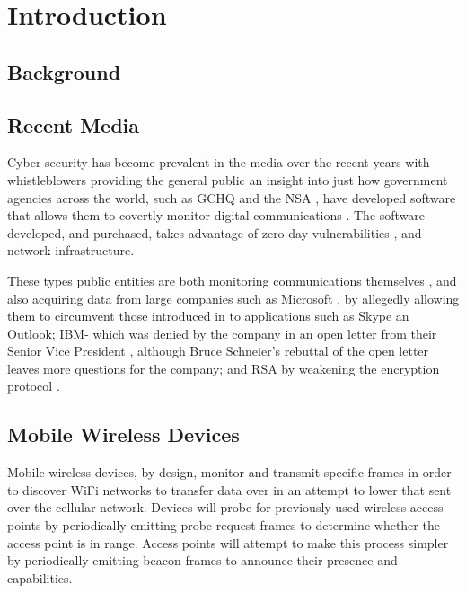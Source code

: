 \section {Introduction}
\subsection{Background}
\subsection{Recent Media}
Cyber security has become prevalent in the media over the recent years with whistleblowers \cite{intro:guardian_snowden} providing the general public an insight into just how government agencies across the world, such as GCHQ \cite{intro:gchq_home}  and the NSA \cite{intro:nsa_home} , have developed software \cite{intro:schneier_nsa_1}\cite{intro:schneier_nsa_3} that allows them to covertly monitor digital communications \cite{intro:schneier_nsa_4}. The software developed, and purchased, takes advantage of zero-day vulnerabilities \cite{intro:nsa_invoice}, and network infrastructure.

These types public entities are both monitoring communications themselves \cite{intro:schneier_nsa_2}, and also acquiring data from large companies such as Microsoft \cite{intro:guardian_ms_nsa}, by allegedly allowing them to circumvent those introduced in to applications such as Skype an Outlook; IBM- which was denied by the company in an open letter from their Senior Vice President \cite{intro:ibm_open_letter}, although Bruce Schneier’s rebuttal \cite{intro:open_open_letter} of the open letter leaves more questions for the company; and RSA by weakening the encryption protocol \cite{intro:bristol_open_letter}.

\subsection{Mobile Wireless Devices}
Mobile wireless devices, by design, monitor and transmit specific frames in order to discover WiFi networks to transfer data over in an attempt to lower that sent over the cellular network. Devices will probe for previously used wireless access points by periodically emitting probe request frames to determine whether the access point is in range. Access points will attempt to make this process simpler by periodically emitting beacon frames to announce their presence and capabilities.

